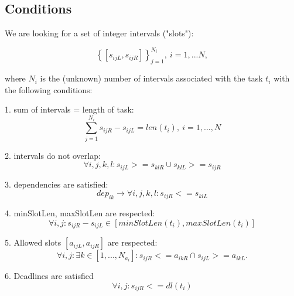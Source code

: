 \documentclass[smallextended]{svjour3}       %
\begin{document}
\subsection{Conditions}
We are looking for a set of integer intervals ("slots"):

$$\left\{\left[s_{ijL}, s_{ijR}\right]\right\}_{j = 1}^{N_i},\ i = 1, ...N,$$

where $N_i$ is the (unknown) number of intervals associated with the task $t_i$ with the following conditions:

1. sum of intervals = length of task:
$$\sum_{j = 1}^{N_i} s_{ijR} - s_{ijL} = len\left(t_i\right),\ i = 1, ..., N$$

2. intervals do not overlap:
$$\forall i, j, k, l: s_{ijL} >= s_{klR} \cup s_{klL} >= s_{ijR}$$
 
3. dependencies are satisfied:
$$dep_{ik} \rightarrow \forall i, j, k, l: s_{ijR} <= s_{klL}$$

4. minSlotLen, maxSlotLen are respected:
$$\forall i, j: s_{ijR} - s_{ijL} \in \left[minSlotLen\left(t_i\right), maxSlotLen\left(t_i\right)\right]$$

5. Allowed slots $\left[a_{ijL}, a_{ijR}\right]$ are respected:
$$\forall i, j: \exists k \in \left[1, ..., N_{a_i}\right] : s_{ijR} <= a_{ikR} \cap s_{ijL} >= a_{ikL}.$$

6. Deadlines are satisfied
$$\forall i, j: s_{ijR} <= dl\left(t_i\right)$$
\end{document}
